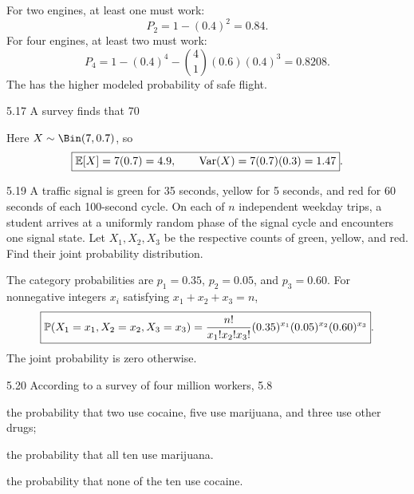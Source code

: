 \documentclass[11pt,oneside]{article}
\begin{document}
\begin{solution}
For two engines, at least one must work:
\[
P_2=1-(0.4)^2=\boxed{0.84}.
\]
For four engines, at least two must work:
\[
P_4=1-(0.4)^4-\binom{4}{1}(0.6)(0.4)^3=\boxed{0.8208}.
\]
The  has the higher modeled probability of safe flight.
\end{solution}

\begin{exercise}{5.17}
A survey finds that 70%
\end{exercise}

\begin{solution}
Here $X\sim\Bin(7,0.7)$, so
\[
\boxed{\mathbb{E}[X]=7(0.7)=4.9,\qquad \operatorname{Var}(X)=7(0.7)(0.3)=1.47}.
\]
\end{solution}

\begin{exercise}{5.19}
A traffic signal is green for 35 seconds, yellow for 5 seconds, and red for 60 seconds of each 100-second cycle. On each of $n$ independent weekday trips, a student arrives at a uniformly random phase of the signal cycle and encounters one signal state. Let $X_1,X_2,X_3$ be the respective counts of green, yellow, and red. Find their joint probability distribution.
\end{exercise}

\begin{solution}
The category probabilities are $p_1=0.35$, $p_2=0.05$, and $p_3=0.60$. For nonnegative integers $x_i$ satisfying $x_1+x_2+x_3=n$,
\[
\boxed{\mathbb{P}(X_1=x_1,X_2=x_2,X_3=x_3)
=\frac{n!}{x_1!x_2!x_3!}(0.35)^{x_1}(0.05)^{x_2}(0.60)^{x_3}}.
\]
The joint probability is zero otherwise.
\end{solution}

\begin{exercise}{5.20}
According to a survey of four million workers, 5.8%
\par
\begin{exercisesubparts}
\item the probability that two use cocaine, five use marijuana, and three use other drugs;
\item the probability that all ten use marijuana.
\item the probability that none of the ten use cocaine.
\end{exercisesubparts}
\end{exercise}
\end{document}
